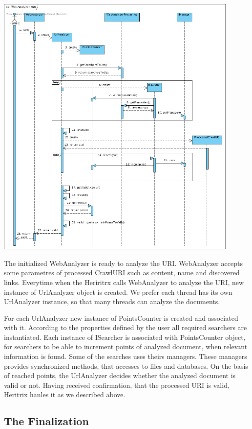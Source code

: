 \documentclass[11pt,a4paper]{article}
\begin{document}
\begin{center}
\includegraphics[width=120mm]{SD3.png}
\end{center}

The initialized WebAnalyzer is ready to analyze the URI. WebAnalyzer accepts some parametres of processed CrawlURI such as content, name and discovered links. Everytime when the Heriritrx calls WebAnalyzer to analyze the URI, new instance of UrlAnalyzer object is created. We prefer each thread has its own UrlAnalyzer instance, so that many threads can analyze the documents.

For each UrlAnalyzer new instance of PointsCounter is created and associated with it. According to the properties defined by the user all required searchers are instantiated. Each instance of ISearcher is associated with PointsCounter object, for searchers to be able to increment points of analyzed document, when relevant information is found. Some of the searches uses theirs managers. These managers provides synchronized methods, that accesses to files and databases. On the basis of reached points, the UrlAnalyzer decides whether the analyzed document is valid or not. Having received confirmation, that the processed URI is valid, Heritrix hanles it as we described above.

\subsection{The Finalization}
\end{document}

